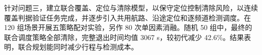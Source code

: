 {\heiti 针对问题三}\songti，建立{\heiti 联合覆盖、定位与清除模型}\songti，以保守定位控制清除风险，以连续覆盖判据验证任务完成，并逐步引入共用航路、沿途定位和逐频道检测调度。在 120 组场景开展五策略配对实验，另作 80 次单因素消融。随机 50 组中，最终的联合调度策略全部清除，完整退出时间均值 3067 s，{\heiti 较初代减少 42.6\%}\songti。结果表明，联合规划能同时减少行程与检测成本。
